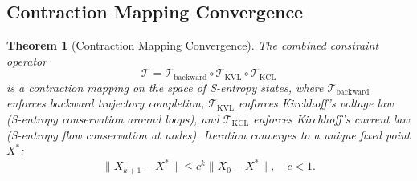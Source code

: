 \documentclass[twocolumn,10pt]{article}
\newtheorem{theorem}{Theorem}[section]
\theoremstyle{remark}
\begin{document}
\subsection{Contraction Mapping Convergence}

\begin{theorem}[Contraction Mapping Convergence]
\label{thm:contraction}
The combined constraint operator
\begin{equation}
\mathcal{T} = \mathcal{T}_{\mathrm{backward}} \circ \mathcal{T}_{\mathrm{KVL}} \circ \mathcal{T}_{\mathrm{KCL}}
\label{eq:contraction_op}
\end{equation}
is a contraction mapping on the space of S-entropy states, where $\mathcal{T}_{\mathrm{backward}}$ enforces backward trajectory completion, $\mathcal{T}_{\mathrm{KVL}}$ enforces Kirchhoff's voltage law \cite{kirchhoff1845} (S-entropy conservation around loops), and $\mathcal{T}_{\mathrm{KCL}}$ enforces Kirchhoff's current law (S-entropy flow conservation at nodes). Iteration converges to a unique fixed point $X^*$:
\begin{equation}
\|X_{k+1} - X^*\| \leq c^k \|X_0 - X^*\|, \quad c < 1.
\label{eq:convergence}
\end{equation}
\end{theorem}
\end{document}

